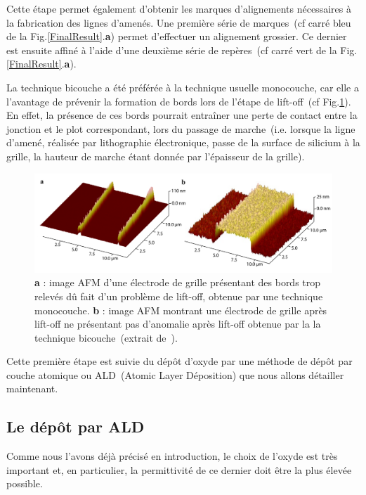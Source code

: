 Cette étape permet également d'obtenir les marques d'alignements nécessaires à la fabrication des lignes d'amenés. Une première série de marques~(cf carré bleu de la Fig.\ref{FinalResult}.\textbf{a}) permet d'effectuer un alignement grossier. Ce dernier est ensuite affiné à l'aide d'une deuxième série de repères~(cf carré vert de la Fig.\ref{FinalResult}.\textbf{a}).

La technique bicouche a été préférée à la technique usuelle monocouche, car elle a l'avantage de prévenir la formation de bords lors de l'étape de lift-off~(cf Fig.\ref{lift-off}). En effet, la présence de ces bords pourrait entraîner une perte de contact entre la jonction et le plot correspondant, lors du passage de marche~(i.e. lorsque la ligne d'amené, réalisée par lithographie électronique, passe de la surface de silicium à la grille, la hauteur de marche étant donnée par l'épaisseur de la grille).


\begin{figure}
\centering \includegraphics[scale=0.45]{Fabrication/BatmanGrille/BatmanGrille.pdf}
\caption{\textbf{a} : image AFM d'une électrode de grille présentant des bords trop relevés d\^u fait d'un problème de lift-off, obtenue par une technique monocouche. \textbf{b} : image AFM montrant une électrode de grille après lift-off ne présentant pas d'anomalie après lift-off obtenue par la la technique bicouche~(extrait de~\cite{RochPhD}).}
\label{lift-off}
\end{figure}

Cette première étape est suivie du dépôt d'oxyde par une méthode de dépôt par couche atomique ou ALD~(Atomic Layer Déposition) que nous allons détailler maintenant.

\subsection{Le dép\^ot par ALD}

Comme nous l'avons déjà précisé en introduction, le choix de l'oxyde est très important et, en particulier, la permittivité de ce dernier doit être la plus élevée possible.

